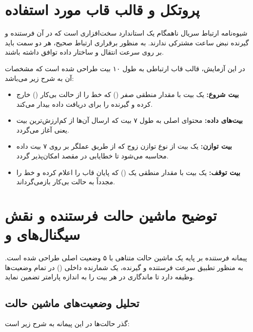 \tableofcontents
\newpage
\listoffigures
\newpage
\section{پروتکل \texorpdfstring{}{UART} و قالب قاب مورد استفاده}
شیوه‌نامه ارتباط سریال ناهمگام یک استاندارد سخت‌افزاری است که در آن فرستنده و گیرنده نبض ساعت مشترکی ندارند. به منظور برقراری ارتباط صحیح، هر دو سمت باید بر روی سرعت انتقال و ساختار داده توافق داشته باشند.

در این آزمایش، قالب قاب ارتباطی به طول ۱۰ بیت طراحی شده است که مشخصات آن به شرح زیر می‌باشد:
\begin{itemize}
    \item \textbf{بیت شروع:} یک بیت با مقدار منطقی صفر () که خط را از حالت بی‌کار () خارج کرده و گیرنده را برای دریافت داده بیدار می‌کند.
    \item \textbf{بیت‌های داده:} محتوای اصلی به طول ۷ بیت که ارسال آن‌ها از کم‌ارزش‌ترین بیت یعنی  آغاز می‌گردد.
    \item \textbf{بیت توازن:} یک بیت از نوع توازن زوج که از طریق عملگر  بر روی ۷ بیت داده محاسبه می‌شود تا خطایابی در مقصد امکان‌پذیر گردد.
    \item \textbf{بیت توقف:} یک بیت با مقدار منطقی یک () که پایان قاب را اعلام کرده و خط را مجدداً به حالت بی‌کار بازمی‌گرداند.
\end{itemize}

\section{توضیح ماشین حالت فرستنده و نقش سیگنال‌های  و }
پیمانه فرستنده بر پایه یک ماشین حالت متناهی با ۵ وضعیت اصلی طراحی شده است. به منظور تطبیق سرعت فرستنده و گیرنده، یک شمارنده داخلی () در تمام وضعیت‌ها وظیفه دارد تا ماندگاری در هر بیت را به اندازه پارامتر  تضمین نماید.

\subsection{تحلیل وضعیت‌های ماشین حالت}
گذر حالت‌ها در این پیمانه به شرح زیر است:

